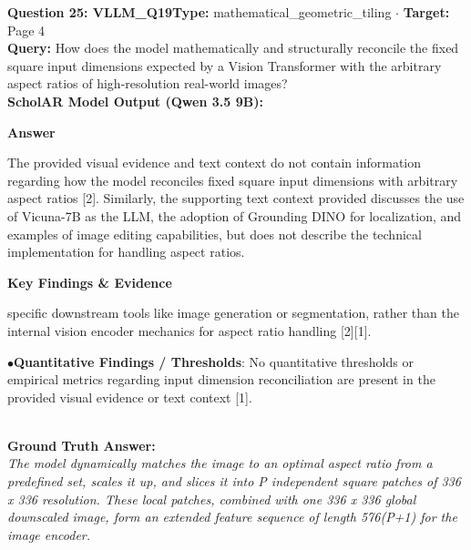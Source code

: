 \documentclass[10pt,a4paper]{article}
\begin{document}
\begin{tcolorbox}[questionbox]
{\noindent\bfseries\large\color{navy} Question 25: VLLM\_Q19}\hfill {\footnotesize\color{darkteal}\textbf{Type:} mathematical\_geometric\_tiling $\cdot$ \textbf{Target:} Page 4}\\[4pt]
{\noindent\bfseries\color{accentblue} Query: } How does the model mathematically and structurally reconcile the fixed square input dimensions expected by a Vision Transformer with the arbitrary aspect ratios of high-resolution real-world images?\\[6pt]
{\noindent\bfseries\color{navy} ScholAR Model Output (Qwen 3.5 9B):}\\[2pt]
{\small \noindent \textbf{Answer}\par\vspace{3pt}The provided visual evidence and text context do not contain information regarding how the model reconciles fixed square input dimensions with arbitrary aspect ratios [2].  Similarly, the supporting text context provided discusses the use of Vicuna-7B as the LLM, the adoption of Grounding DINO for localization, and examples of image editing capabilities, but does not describe the technical implementation for handling aspect ratios.\par\vspace{3pt}\noindent \textbf{Key Findings \& Evidence}\par\vspace{3pt}specific downstream tools like image generation or segmentation, rather than the internal vision encoder mechanics for aspect ratio handling [2][1].\par\vspace{3pt}\noindent\hspace*{8pt}$\bullet$\hspace*{4pt}\textbf{Quantitative Findings / Thresholds}: No quantitative thresholds or empirical metrics regarding input dimension reconciliation are present in the provided visual evidence or text context [1].}\\[6pt]
{\noindent\bfseries\color{darkteal} Ground Truth Answer:}\\[2pt]
{\small\itshape The model dynamically matches the image to an optimal aspect ratio from a predefined set, scales it up, and slices it into P independent square patches of 336 x 336 resolution. These local patches, combined with one 336 x 336 global downscaled image, form an extended feature sequence of length 576(P+1) for the image encoder.}\\[4pt]

\end{tcolorbox}
\end{document}
